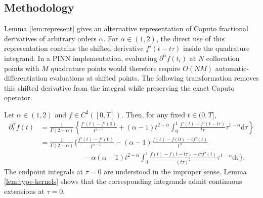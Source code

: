 \documentclass[preprint,3p,times]{elsarticle}
\def\dta{\partial_t^\alpha}
\def\d{\mathrm{d}}
\begin{document}
\subsection{Methodology}
\begingroup\color{blue}
Lemma \ref{lem:represent} gives an alternative representation of Caputo fractional derivatives of arbitrary orders $\alpha$. For $\alpha\in(1,2)$, the direct use of this representation contains the shifted derivative $f'(t-t\tau)$ inside the quadrature integrand. In a PINN implementation, evaluating $\partial^\alpha f(t_i)$ at $N$ collocation points with $M$ quadrature points would therefore require $O(NM)$ automatic-differentiation evaluations at shifted points. The following transformation removes this shifted derivative from the integral while preserving the exact Caputo operator.

\begin{theorem}
\label{thm:represent_2}
Let $\alpha\in(1,2)$ and $f\in C^2([0,T])$. Then, for any fixed $t\in(0,T]$,
\begin{align}
\dta f(t)
&=\frac{1}{\Gamma(2-\alpha)}
\left\{
\frac{f'(t)-f'(0)}{t^{\alpha-1}}
+(\alpha-1)t^{2-\alpha}
\int_0^1
\frac{f'(t)-f'(t-t\tau)}{t\tau}\tau^{1-\alpha}\d\tau
\right\} \label{eqn:direct}\\[0.5em]
&=\frac{1}{\Gamma(2-\alpha)}
\Bigg\{
\frac{f'(t)-f'(0)}{t^{\alpha-1}}
-(\alpha-1)\frac{f(t)-f(0)-t f'(t)}{t^\alpha}
\nonumber\\
&\hspace{6em}
-\alpha(\alpha-1)t^{2-\alpha}
\int_0^1
\frac{f(t)-f(t-t\tau)-t\tau f'(t)}{(t\tau)^2}\tau^{1-\alpha}\d\tau
\Bigg\}.\label{eqn:transformed}
\end{align}
The endpoint integrals at $\tau=0$ are understood in the improper sense. Lemma \ref{lem:type-kernels} shows that the corresponding integrands admit continuous extensions at $\tau=0$.
\end{theorem}
\end{document}
